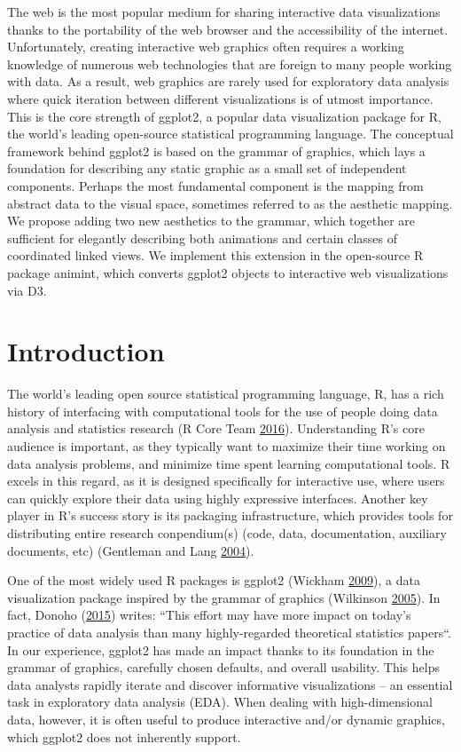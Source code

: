 \documentclass[12pt,]{isuthesis}
\begin{document}
The web is the most popular medium for sharing interactive data
visualizations thanks to the portability of the web browser and the
accessibility of the internet. Unfortunately, creating interactive web
graphics often requires a working knowledge of numerous web technologies
that are foreign to many people working with data. As a result, web
graphics are rarely used for exploratory data analysis where quick
iteration between different visualizations is of utmost importance. This
is the core strength of ggplot2, a popular data visualization package
for R, the world's leading open-source statistical programming language.
The conceptual framework behind ggplot2 is based on the grammar of
graphics, which lays a foundation for describing any static graphic as a
small set of independent components. Perhaps the most fundamental
component is the mapping from abstract data to the visual space,
sometimes referred to as the aesthetic mapping. We propose adding two
new aesthetics to the grammar, which together are sufficient for
elegantly describing both animations and certain classes of coordinated
linked views. We implement this extension in the open-source R package
animint, which converts ggplot2 objects to interactive web
visualizations via D3.

\section{Introduction}
\label{sec:intro}

The world's leading open source statistical programming language, R, has
a rich history of interfacing with computational tools for the use of
people doing data analysis and statistics research (R Core Team
\protect\hyperlink{ref-RCore}{2016}). Understanding R's core audience is
important, as they typically want to maximize their time working on data
analysis problems, and minimize time spent learning computational tools.
R excels in this regard, as it is designed specifically for interactive
use, where users can quickly explore their data using highly expressive
interfaces. Another key player in R's success story is its packaging
infrastructure, which provides tools for distributing entire research
conpendium(s) (code, data, documentation, auxiliary documents, etc)
(Gentleman and Lang \protect\hyperlink{ref-Gentleman:Lang}{2004}).

One of the most widely used R packages is ggplot2 (Wickham
\protect\hyperlink{ref-ggplot2}{2009}), a data visualization package
inspired by the grammar of graphics (Wilkinson
\protect\hyperlink{ref-Wilkinson:2005}{2005}). In fact, Donoho
(\protect\hyperlink{ref-Donoho:2015tu}{2015}) writes: ``This effort may
have more impact on today's practice of data analysis than many
highly-regarded theoretical statistics papers``. In our experience,
ggplot2 has made an impact thanks to its foundation in the grammar of
graphics, carefully chosen defaults, and overall usability. This helps
data analysts rapidly iterate and discover informative visualizations --
an essential task in exploratory data analysis (EDA). When dealing with
high-dimensional data, however, it is often useful to produce
interactive and/or dynamic graphics, which ggplot2 does not inherently
support.
\end{document}
